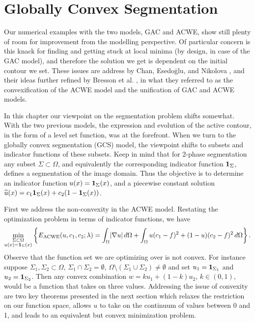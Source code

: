 \chapter{Globally Convex Segmentation}
\label{ch:gcs}
Our numerical examples with the two models, GAC and ACWE, show still plenty of room for improvement from the modelling perspective. Of particular concern is this knack for finding and getting stuck at local minima (by design, in case of the GAC model), and therefore the solution we get is dependent on the initial contour we set. These issues are address by Chan, Esedo\={g}lu, and Nikolova \cite{chan2006algorithms}, and their ideas further refined by Bresson et al. \cite{bresson2007fast}, in what they referred to as the convexification of the ACWE model and the unification of GAC and ACWE models.

In this chapter our viewpoint on the segmentation problem shifts somewhat. With the two previous models, the expression and evolution of the active contour, in the form of a level set function, was at the forefront. When we turn to the globally convex segmentation (GCS) model, the viewpoint shifts to subsets and indicator functions of these subsets. Keep in mind that for 2-phase segmentation any subset $\Sigma \subset \Omega$, and equivalently the corresponding indicator function $\mathbf{1}_\Sigma$, defines a segmentation of the image domain. Thus the objective is to determine an indicator function $u(x) = \mathbf{1}_\Sigma(x)$, and a piecewise constant solution $\widetilde u(x) = c_1 \mathbf{1}_\Sigma(x) + c_2 (1 - \mathbf{1}_\Sigma(x))$. 

First we address the non-convexity in the ACWE model. Restating the optimization problem in terms of indicator functions, we have 
\begin{align}
\min_{\substack{\Sigma\subset\Omega \\ 
		u(x) = \mathbf{1}_\Sigma(x)}} 
\left\{E_\textrm{ACWE}(u, c_1, c_2; \lambda)
= \int_{\Omega} \lvert\nabla u\rvert \,d\Omega 
+ \int_\Omega u(c_1 - f)^2   + (1-u)(c_2 - f)^2 \,d\Omega 
\right\}.
\label{eq:eacwe2}
\end{align}
Observe that the function set we are optimizing over is not convex. For instance suppose $\Sigma_1, \Sigma_2 \subset \Omega$, $\Sigma_1 \cap \Sigma_2 = \emptyset$, $\Omega \setminus (\Sigma_1 \cup \Sigma_2) \neq \emptyset$ and set $u_1 = \mathbf{1}_{\Sigma_1}$ and $u_2 = \mathbf{1}_{\Sigma_2}$. Then any convex combination $w = ku_1 + (1-k)u_2$, $k \in (0,1)$, would be a function that takes on three values. Addressing the issue of convexity are two key theorems presented in the next section which relaxes the restriction on our function space, allows $u$ to take on the continuum of values between 0 and 1, and leads to an equivalent but convex minimization problem.

